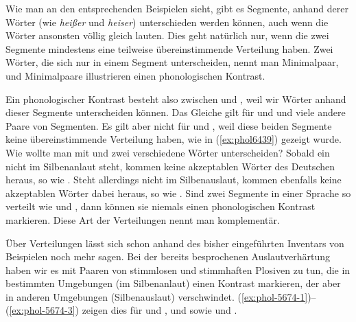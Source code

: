 Wie man an den entsprechenden Beispielen sieht, gibt es Segmente, anhand derer Wörter (wie \textit{heißer} und \textit{heiser}) unterschieden werden können, auch wenn die Wörter ansonsten völlig gleich lauten.
Dies geht natürlich nur, wenn die zwei Segmente mindestens eine teilweise übereinstimmende Verteilung haben.
Zwei Wörter, die sich nur in einem Segment unterscheiden, nennt man Minimalpaar, und Minimalpaare illustrieren einen phonologischen Kontrast.


Ein phonologischer Kontrast besteht also \zB zwischen \textipa{[t]} und \textipa{[k]}, weil wir Wörter anhand dieser Segmente unterscheiden können.
Das Gleiche gilt für \textipa{[s]} und \textipa{[z]} und viele andere Paare von Segmenten.
Es gilt aber nicht für \textipa{[h]} und \textipa{[N]}, weil diese beiden Segmente keine übereinstimmende Verteilung haben, wie in (\ref{ex:phol6439}) gezeigt wurde.
Wie wollte man mit \textipa{[h]} und \textipa{[N]} zwei verschiedene Wörter unterscheiden?
Sobald ein \textipa{[h]} nicht im Silbenanlaut steht, kommen keine akzeptablen Wörter des Deutschen heraus, so wie \textipa{[SVUh]}.
Steht allerdings \textipa{[N]} nicht im Silbenauslaut, kommen ebenfalls keine akzeptablen Wörter dabei heraus, so wie \textipa{[Nand]}.
Sind zwei Segmente in einer Sprache so verteilt wie \textipa{[h]} und \textipa{[N]}, dann können sie niemals einen phonologischen Kontrast markieren.
Diese Art der Verteilungen nennt man komplementär.


Über Verteilungen lässt sich schon anhand des bisher eingeführten Inventars von Beispielen noch mehr sagen.
Bei der bereits besprochenen Auslautverhärtung haben wir es mit Paaren von stimmlosen und stimmhaften Plosiven zu tun, die in bestimmten Umgebungen (im Silbenanlaut) einen Kontrast markieren, der aber in anderen Umgebungen (Silbenauslaut) verschwindet.
(\ref{ex:phol-5674-1})--(\ref{ex:phol-5674-3}) zeigen dies für \textipa{[g]} und \textipa{[k]}, \textipa{[d]} und \textipa{[t]} sowie \textipa{[b]} und \textipa{[p]}.

